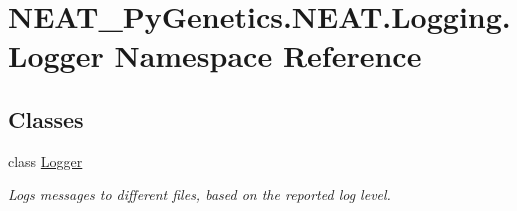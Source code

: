 \hypertarget{namespaceNEAT__PyGenetics_1_1NEAT_1_1Logging_1_1Logger}{}\section{N\+E\+A\+T\+\_\+\+Py\+Genetics.\+N\+E\+A\+T.\+Logging.\+Logger Namespace Reference}
\label{namespaceNEAT__PyGenetics_1_1NEAT_1_1Logging_1_1Logger}
\subsection*{Classes}
\begin{DoxyCompactItemize}
\item 
class \hyperlink{classNEAT__PyGenetics_1_1NEAT_1_1Logging_1_1Logger_1_1Logger}{Logger}
\begin{DoxyCompactList}\small\item\em Logs messages to different files, based on the reported log level. \end{DoxyCompactList}\end{DoxyCompactItemize}
